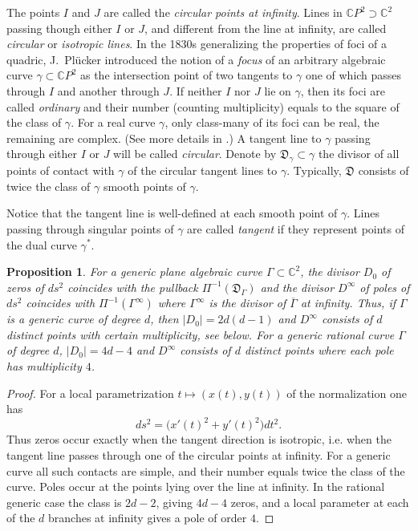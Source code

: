 \documentclass[reqno]{amsart}
\newtheorem{proposition}[theorem]{Proposition}
\newcommand{\bC}{\mathbb{C}}
\newcommand {\ga}{\gamma}
\newcommand {\Ga}{\Gamma}
\theoremstyle{definition}
\theoremstyle{remark}
\theoremstyle{definition}
\theoremstyle{definition}
\theoremstyle{definition}
\begin{document}
\medskip 
The points $I$ and $J$ are called  the \emph{circular points at infinity}. Lines in $\bC P^2\supset \bC^2$ passing though  either $I$ or $J$, and different from the line at infinity, are called \emph{circular} or \emph{isotropic lines}.  In the 1830s generalizing the properties of foci of a quadric,  J.~Pl\"ucker introduced the notion of a \emph{focus} of an arbitrary algebraic curve $\ga \subset \bC P^2$ as the intersection point of two tangents to $\ga$ one of which passes through $I$ and another through $J$. If neither $I$ nor $J$ lie on $\ga$, then its foci are called \emph{ordinary} and their number (counting multiplicity)  equals to the square of the class of $\ga$. For a real curve $\ga$,  only class-many of its foci can be real, the remaining are complex. (See more details in \cite{Ri}.) A tangent line to $\ga$ passing through either $I$ or $J$ will be called \emph{circular}. Denote by $\mathfrak D_\ga\subset \ga$ the divisor of all points of contact with $\ga$ of the circular tangent lines to $\ga$. Typically, $\mathfrak D$ consists of twice the class of $\ga$ smooth points of $\ga$.

Notice that the tangent line is well-defined at each smooth point of $\ga$. Lines passing through singular points of $\ga$ are called \emph{tangent} if they represent points of the dual curve $\ga^\ast$.

\begin{proposition}\label{prop:divisor} For a  generic plane algebraic curve $\Ga\subset \bC^2$, the divisor  $D_0$ of zeros of $ds^2$ coincides with the pullback  $\Pi^{-1}(\mathfrak D_\Ga)$  and the divisor $D^\infty$ of poles of $ds^2$ coincides with $\Pi^{-1}(\Ga^\infty)$ where $\Ga^\infty$ is the divisor of $\overline \Ga$  at infinity. Thus, if $\Ga$ is a generic curve of degree $d$, then $|D_0|=2d(d-1)$ and $D^\infty$ consists of $d$ distinct points with certain multiplicity, see below. For a generic rational curve $\Ga$ of degree $d$, $|D_0|=4d-4$ and $D^\infty$ consists of $d$ distinct points where each pole has  multiplicity $4$.
\end{proposition}

\begin{proof}
For a local parametrization $t\mapsto (x(t),y(t))$ of the normalization one has
\[
 ds^2=\bigl(x'(t)^2+y'(t)^2\bigr)dt^2.
\]
Thus zeros occur exactly when the tangent direction is isotropic, i.e. when the tangent line passes through one of the circular points at infinity. For a generic curve all such contacts are simple, and their number equals twice the class of the curve. Poles occur at the points lying over the line at infinity. In the rational generic case the class is $2d-2$, giving $4d-4$ zeros, and a local parameter at each of the $d$ branches at infinity gives a pole of order $4$.
\end{proof}
\end{document}
